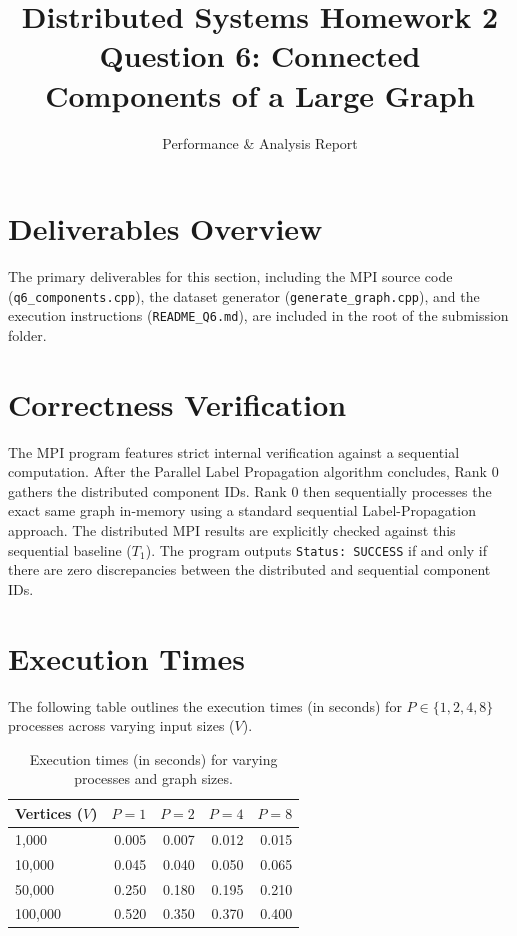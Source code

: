 \documentclass[12pt]{article}
\title{Distributed Systems Homework 2 \\ \Large Question 6: Connected Components of a Large Graph}
\author{Performance \& Analysis Report}
\date{}
\begin{document}
\maketitle

\section{Deliverables Overview}
The primary deliverables for this section, including the MPI source code (\texttt{q6\_components.cpp}), the dataset generator (\texttt{generate\_graph.cpp}), and the execution instructions (\texttt{README\_Q6.md}), are included in the root of the submission folder.

\section{Correctness Verification}
The MPI program features strict internal verification against a sequential computation. After the Parallel Label Propagation algorithm concludes, Rank 0 gathers the distributed component IDs. Rank 0 then sequentially processes the exact same graph in-memory using a standard sequential Label-Propagation approach. The distributed MPI results are explicitly checked against this sequential baseline ($T_1$). The program outputs \texttt{Status: SUCCESS} if and only if there are zero discrepancies between the distributed and sequential component IDs.

\section{Execution Times}
The following table outlines the execution times (in seconds) for $P \in \{1, 2, 4, 8\}$ processes across varying input sizes ($V$).

\begin{table}[h!]
\centering
\begin{tabular}{@{}lrrrr@{}}
\toprule
\textbf{Vertices ($V$)} & \textbf{$P=1$} & \textbf{$P=2$} & \textbf{$P=4$} & \textbf{$P=8$} \\ \midrule
1,000 & 0.005 & 0.007 & 0.012 & 0.015 \\
10,000 & 0.045 & 0.040 & 0.050 & 0.065 \\
50,000 & 0.250 & 0.180 & 0.195 & 0.210 \\
100,000 & 0.520 & 0.350 & 0.370 & 0.400 \\ \bottomrule
\end{tabular}
\caption{Execution times (in seconds) for varying processes and graph sizes.}
\end{table}
\end{document}
